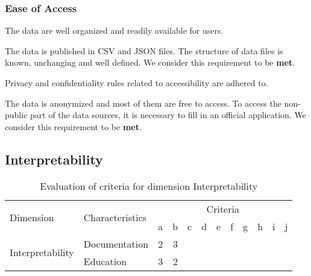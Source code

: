 \subsubsection{Ease of Access}

\begin{QandA}
    \item The data are well organized and readily available for users.
    \begin{answered}
        The data is published in CSV and JSON files.
        The structure of data files is known, unchanging and well defined.
        We consider this requirement to be \textbf{met}.
    \end{answered}

    \item Privacy and confidentiality rules related to accessibility are adhered to.
    \begin{answered}
        The data is anonymized and most of them are free to access.
        To access the non-public part of the data sources, it is necessary to fill in an official application.
        We consider this requirement to be \textbf{met}.
    \end{answered}

\end{QandA}

\newpage
\subsection{Interpretability}

\begin{table}[htbp]
    \centering

    \begin{tabular}{llrrrrrrrrrr}
        \toprule
        \multirow{2}{*}{Dimension}          & \multirow{2}{*}{Characteristics}  & \multicolumn{10}{c}{Criteria}         \\ \cmidrule(lr){3-12}
                                            &                                   & a & b & c & d & e & f & g & h & i & j \\ \midrule
        \multirow{2}{*}{Interpretability}   & Documentation                     & 2 & 3 &   &   &   &   &   &   &   &   \\
                                            & Education                         & 3 & 2 &   &   &   &   &   &   &   &   \\
        \bottomrule
    \end{tabular}

    \caption{Evaluation of criteria for dimension Interpretability}
    \label{table:interpretability-benchmark}
\end{table}
\FloatBarrier

